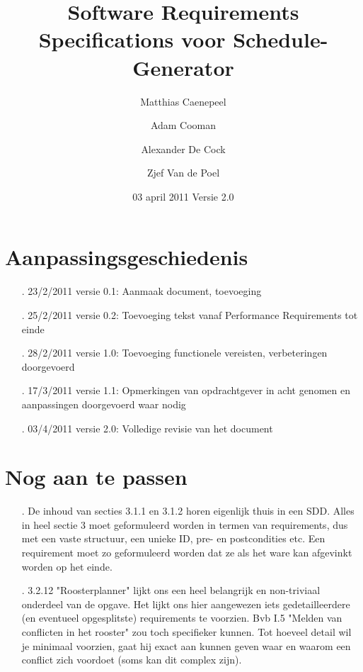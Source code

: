 \documentclass{article}
\title{Software Requirements Specifications voor Schedule-Generator}
\author{Matthias Caenepeel \and Adam Cooman \and Alexander De Cock \and Zjef Van de Poel}
\date{03 april 2011 Versie 2.0}
\begin{document}
\maketitle

\newpage



\section*{Aanpassingsgeschiedenis}
\begin{itemize}
\item[.] 23/2/2011 versie 0.1: Aanmaak document, toevoeging  
\item[.] 25/2/2011 versie 0.2: Toevoeging tekst vanaf Performance Requirements tot einde 
\item[.] 28/2/2011 versie 1.0: Toevoeging functionele vereisten, verbeteringen doorgevoerd 
\item[.] 17/3/2011 versie 1.1: Opmerkingen van opdrachtgever in acht genomen en aanpassingen doorgevoerd waar nodig
\item[.] 03/4/2011 versie 2.0: Volledige revisie van het document
\end{itemize}

\section*{Nog aan te passen}
\begin{itemize}
	\item[.] De inhoud van secties 3.1.1 en 3.1.2 horen eigenlijk thuis in een SDD. Alles in heel sectie 3 moet geformuleerd worden in termen van requirements, dus met een vaste structuur, een unieke ID, pre- en postcondities etc. Een requirement moet zo geformuleerd worden dat ze als het ware kan afgevinkt worden op het einde. \\
	\item[.] 3.2.12 "Roosterplanner" lijkt ons een heel belangrijk en non-triviaal onderdeel van de opgave. Het lijkt ons hier aangewezen iets gedetailleerdere (en eventueel opgesplitste) requirements te voorzien. Bvb I.5 "Melden van conflicten in het rooster" zou toch specifieker kunnen. Tot hoeveel detail wil je minimaal voorzien, gaat hij exact aan kunnen geven waar en waarom een conflict zich voordoet (soms kan dit complex zijn). \\
\end{itemize}
\end{document}
